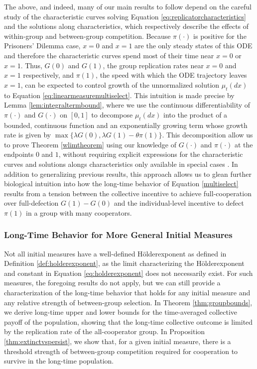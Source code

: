 \documentclass[11pt]{article}
\numberwithin{equation}{section}
\newcommand{\holder}{H{\"o}lder\:}
\begin{document}
{The above, and indeed, many of our main results to follow depend on the careful study of the characteristic curves solving Equation \eqref{eq:replicatorcharacteristics} and the solutions along characteristics, which respectively describe the effects of within-group and between-group competition. Because $\pi(\cdot)$ is positive for the Prisoners' Dilemma case, $x=0$ and $x=1$ are the only steady states of this ODE and therefore the characteristic curves spend most of their time near $x=0$ or $x=1$. Thus, $G(0)$ and $G(1)$, the group replication rates near $x=0$ and $x=1$ respectively, and $\pi(1)$, the speed with which the ODE trajectory leaves $x=1$, can be expected to control growth of the unnormalized solution $\mu_t(dx)$ to Equation \eqref{eq:linearmeasuremultiselect}. This intuition is made precise by Lemma \ref{lem:integraltermbound}, where we use the continuous differentiability of $\pi(\cdot)$ and $G(\cdot)$ on $[0,1]$ to decompose $\mu_t(dx)$ into the product of a bounded, continuous function and an exponentially growing term whose growth rate is given by $\max\{\lambda G(0), \lambda G(1) - \theta \pi(1)\}$. This decomposition allow us to prove Theorem \ref{wlimtheorem} using our knowledge of $G(\cdot)$ and $\pi(\cdot)$ at the endpoints $0$ and $1$, without requiring explicit expressions for the characteristic curves and solutions alongs characteristics only available in special cases \cite{luo2017scaling,cooney2019replicator}. In addition to generalizing previous results, this approach allows us to glean further biological intuition into how the long-time behavior of Equation \eqref{multiselect} results from a tension between the collective incentive to achieve full-cooperation over full-defection $G(1) - G(0)$ and the individual-level incentive to defect $\pi(1)$ in a group with many cooperators.


\subsubsection{Long-Time Behavior for More General Initial Measures}
\label{sec:longtimeresults}

Not all initial measures have a well-defined \holder exponent as defined in Definition \ref{def:holderexponent}, as the limit characterizing the \holder exponent and constant in Equation \eqref{eq:holderexponent} does not necessarily exist. For such measures, the foregoing results do not apply, but we can still provide a characterization of the long-time behavior that holds for any initial measure and any relative strength of between-group selection. In Theorem \ref{thm:groupbounds}, we derive long-time upper and lower bounds for the time-averaged collective payoff of the population, showing that the long-time collective outcome is limited by the replication rate of the all-cooperator group. In Proposition \ref{thm:extinctvspersist}, we show that, for a given initial measure, there is a threshold strength of between-group competition required for cooperation to survive in the long-time population. 


}
\end{document}
